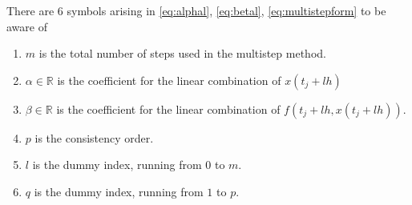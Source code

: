 \documentclass[12pt]{article}
\begin{document}
\begin{observationboxed}
	There are 6 symbols arising in 
	\eqref{eq:alphal},
	\eqref{eq:betal},
	\eqref{eq:multistepform} to be aware of
	\begin{enumerate}
		\item $m$ is the total number of steps used in the multistep method.
		\item $\alpha \in \mathbb{R}$ is the coefficient for the linear combination of $x(t_j+lh)$
		\item $\beta \in \mathbb{R}$ is the coefficient for the linear combination of $f(t_j+lh,x(t_j+lh))$.
		\item $p$ is the consistency order.
		\item $l$ is the dummy index, running from $0$ to $m$.
		\item $q$ is the dummy index, running from $1$ to $p$.
	\end{enumerate}
\end{observationboxed}
\newpage
\end{document}
